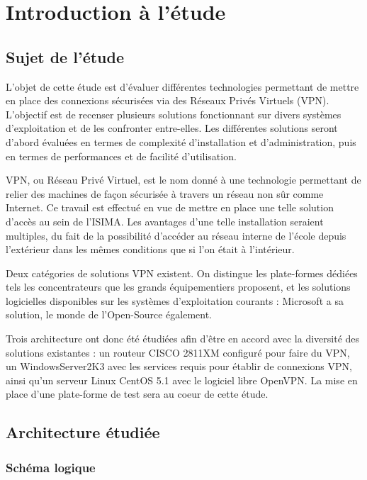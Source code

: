 \section{Introduction à l'étude}
\subsection{Sujet de l'étude}
L'objet de cette étude est d'évaluer différentes technologies permettant de mettre en place des connexions sécurisées via des Réseaux Privés Virtuels (VPN). L'objectif est de recenser plusieurs solutions fonctionnant sur divers systèmes d'exploitation et de les confronter entre-elles. Les différentes solutions seront d'abord évaluées en termes de complexité d'installation et d'administration, puis en termes de performances et de facilité d'utilisation.

VPN, ou Réseau Privé Virtuel, est le nom donné à une technologie permettant de relier des machines de façon sécurisée à travers un réseau non sûr comme Internet. Ce travail est effectué en vue de mettre en place une telle solution d'accès au sein de l'ISIMA. Les avantages d'une telle installation seraient multiples, du fait de la possibilité d'accéder au réseau interne de l'école depuis l'extérieur dans les mêmes conditions que si l'on était à l'intérieur.

Deux catégories de solutions VPN existent. On distingue les plate-formes dédiées tels les concentrateurs que les grands équipementiers proposent, et les solutions logicielles disponibles sur les systèmes d'exploitation courants : Microsoft a sa solution, le monde de l'Open-Source également.

Trois architecture ont donc été étudiées afin d'être en accord avec la diversité des solutions existantes : un routeur CISCO 2811XM configuré pour faire du VPN, un WindowsServer2K3 avec les services requis pour établir de connexions VPN, ainsi qu'un serveur Linux CentOS 5.1 avec le logiciel libre OpenVPN. La mise en place d'une plate-forme de test sera au coeur de cette étude.

\subsection{Architecture étudiée}
\label{section_architecture_etudiee}
\subsubsection{Schéma logique}

